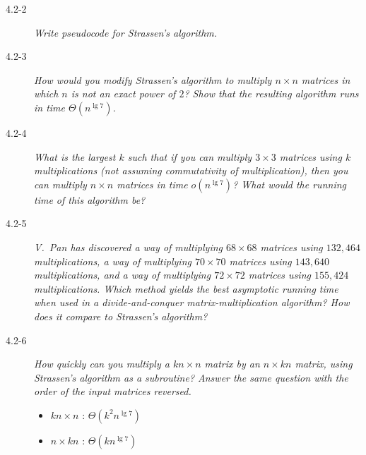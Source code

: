 \begin{description}
  \item[4.2-2] {\itshape Write pseudocode for Strassen’s algorithm.}
    \begin{exrev}
      
    \end{exrev}

  \item[4.2-3]{\itshape How would you modify Strassen’s algorithm to multiply $n \times n$ matrices in which $n$ is not an exact power of $2$? Show that the resulting algorithm runs in time $\Theta (n^{\lg 7})$.}
    \begin{exrev}
      
    \end{exrev}
  \item[4.2-4]{\itshape What is the largest $k$ such that if you can multiply $3 \times 3$ matrices using $k$ multiplications (not assuming commutativity of multiplication), then you can multiply $n \times n$ matrices in time $o(n^{\lg 7})$? What would the running time of this algorithm be?}

    \begin{exrev}
      
    \end{exrev}
  \item[4.2-5]{\itshape V.~Pan has discovered a way of multiplying $68\times 68$ matrices using $132,464$ multiplications, a way of multiplying $70\times 70$ matrices using $143,640$ multiplications, and a way of multiplying $72\times 72$ matrices using $155,424$ multiplications. Which method yields the best asymptotic running time when used in a divide-and-conquer matrix-multiplication algorithm? How does it compare to Strassen’s algorithm?}

    \begin{exrev}
      
    \end{exrev}

  \item[4.2-6]{\itshape How quickly can you multiply a $kn\times n$ matrix by an $n\times kn$ matrix, using Strassen’s algorithm as a subroutine? Answer the same question with the order of the input matrices reversed.}

    \begin{ex}   %
      \begin{itemize}
        \item $kn \times n$ : $\Theta(k^2 n^{\lg 7})$
        \item $n \times kn$ : $\Theta(kn^{\lg 7})$
      \end{itemize}
    \end{ex}

\end{description}

